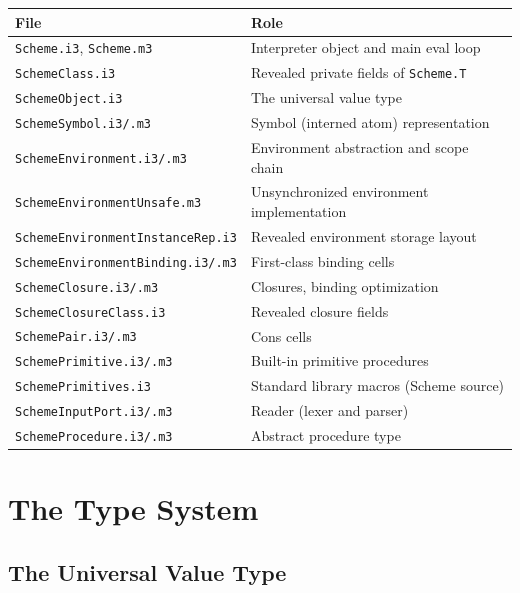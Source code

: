 \documentclass[12pt]{report}
\begin{document}
\begin{center}
\begin{tabular}{ll}
\toprule
\textbf{File} & \textbf{Role} \\
\midrule
\texttt{Scheme.i3}, \texttt{Scheme.m3} & Interpreter object and main eval loop \\
\texttt{SchemeClass.i3} & Revealed private fields of \texttt{Scheme.T} \\
\texttt{SchemeObject.i3} & The universal value type \\
\texttt{SchemeSymbol.i3/.m3} & Symbol (interned atom) representation \\
\texttt{SchemeEnvironment.i3/.m3} & Environment abstraction and scope chain \\
\texttt{SchemeEnvironmentUnsafe.m3} & Unsynchronized environment implementation \\
\texttt{SchemeEnvironmentInstanceRep.i3} & Revealed environment storage layout \\
\texttt{SchemeEnvironmentBinding.i3/.m3} & First-class binding cells \\
\texttt{SchemeClosure.i3/.m3} & Closures, binding optimization \\
\texttt{SchemeClosureClass.i3} & Revealed closure fields \\
\texttt{SchemePair.i3/.m3} & Cons cells \\
\texttt{SchemePrimitive.i3/.m3} & Built-in primitive procedures \\
\texttt{SchemePrimitives.i3} & Standard library macros (Scheme source) \\
\texttt{SchemeInputPort.i3/.m3} & Reader (lexer and parser) \\
\texttt{SchemeProcedure.i3/.m3} & Abstract procedure type \\
\bottomrule
\end{tabular}
\end{center}

\chapter{The Type System}
\label{ch:types}

\section{The Universal Value Type}
\end{document}
